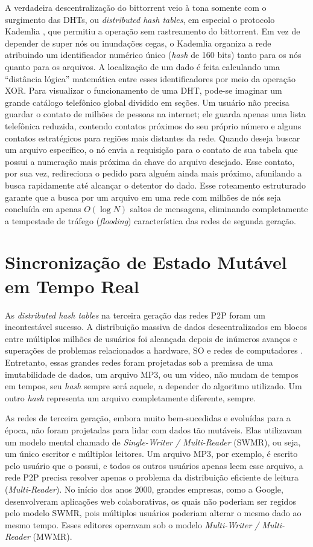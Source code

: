 A verdadeira descentralização do bittorrent veio à tona somente com o
surgimento das DHTs, ou \textit{distributed hash tables}, em especial o protocolo
Kademlia \cite{maymounkovmazieres2002}, que permitiu a operação sem
rastreamento do bittorrent. Em vez de depender de super nós ou inundações
cegas, o Kademlia organiza a rede atribuindo um identificador numérico
único (\textit{hash} de 160 bits) tanto para os nós quanto para os arquivos. A
localização de um dado é feita calculando uma ``distância lógica''
matemática entre esses identificadores por meio da operação XOR. Para
visualizar o funcionamento de uma DHT, pode-se imaginar um grande catálogo
telefônico global dividido em seções. Um usuário não precisa guardar o
contato de milhões de pessoas na internet; ele guarda apenas uma lista
telefônica reduzida, contendo contatos próximos do seu próprio número e
alguns contatos estratégicos para regiões mais distantes da rede. Quando
deseja buscar um arquivo específico, o nó envia a requisição para o
contato de sua tabela que possui a numeração mais próxima da chave do
arquivo desejado. Esse contato, por sua vez, redireciona o pedido para
alguém ainda mais próximo, afunilando a busca rapidamente até alcançar o
detentor do dado. Esse roteamento estruturado garante que a busca por um
arquivo em uma rede com milhões de nós seja concluída em apenas $O(\log N)$
saltos de mensagens, eliminando completamente a tempestade de tráfego
(\textit{flooding}) característica das redes de segunda geração.

\section{Sincronização de Estado Mutável em Tempo Real}

As \textit{distributed hash tables} na terceira geração das redes P2P foram um
incontestável sucesso. A distribuição massiva de dados descentralizados em
blocos entre múltiplos milhões de usuários foi alcançada depois de
inúmeros avanços e superações de problemas relacionados a hardware, SO e
redes de computadores \cite{maymounkovmazieres2002,cohen2003}. Entretanto,
essas grandes redes foram projetadas sob a premissa de uma imutabilidade de
dados, um arquivo MP3, ou um vídeo, não mudam de tempos em tempos, seu \textit{hash}
sempre será aquele, a depender do algoritmo utilizado. Um outro \textit{hash}
representa um arquivo completamente diferente, sempre.

As redes de terceira geração, embora muito bem-sucedidas e evoluídas para a
época, não foram projetadas para lidar com dados tão mutáveis. Elas utilizavam um
modelo mental chamado de \textit{Single-Writer / Multi-Reader} (SWMR), ou seja, um único
escritor e múltiplos leitores. Um arquivo MP3, por exemplo, é escrito pelo usuário que
o possui, e todos os outros usuários apenas leem esse arquivo, a rede P2P precisa resolver
apenas o problema da distribuição eficiente de leitura (\textit{Multi-Reader}). No início dos anos 2000,
grandes empresas, como a Google, desenvolveram aplicações web colaborativas, os quais não
poderiam ser regidos pelo modelo SWMR, pois múltiplos usuários poderiam alterar o mesmo dado
ao mesmo tempo. Esses editores operavam sob o modelo \textit{Multi-Writer / Multi-Reader} (MWMR).

